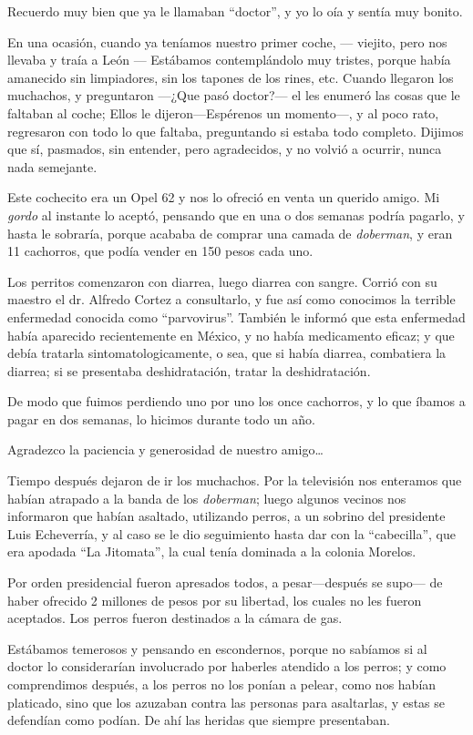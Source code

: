 \documentclass[letterpaper, 12pt]{book}
\begin{document}
Recuerdo muy bien que ya le llamaban ``doctor'', y yo lo oía y sentía muy bonito.

En una ocasión, cuando ya teníamos nuestro primer coche, --- viejito, pero nos llevaba y traía a León --- Estábamos contemplándolo muy tristes, porque había amanecido sin limpiadores, sin los tapones de los rines, etc. Cuando llegaron los muchachos, y preguntaron ---¿Que pasó doctor?--- el les enumeró las cosas que le faltaban al coche; Ellos le dijeron---Espérenos un momento---, y al poco rato, regresaron con todo lo que faltaba, preguntando si estaba todo completo. Dijimos que sí, pasmados, sin entender, pero agradecidos, y no volvió a ocurrir, nunca nada semejante.

Este cochecito era un Opel 62 y nos lo ofreció en venta un querido amigo. Mi \textit{gordo} al instante lo aceptó, pensando que en una o dos semanas podría pagarlo, y hasta le sobraría, porque acababa de comprar una camada de \textit{doberman}, y eran 11 cachorros, que podía vender en 150 pesos cada uno. 

Los perritos comenzaron con diarrea, luego diarrea con sangre. Corrió con su maestro el dr. Alfredo Cortez a consultarlo, y fue así como conocimos la terrible enfermedad conocida como ``parvovirus''. También le informó que esta enfermedad había aparecido recientemente en México, y no había medicamento eficaz; y que debía tratarla sintomatologicamente, o sea, que si había diarrea, combatiera la diarrea; si se presentaba deshidratación, tratar la deshidratación.

De modo que fuimos perdiendo uno por uno los once cachorros, y lo que íbamos a pagar en dos semanas, lo hicimos durante todo un año.

Agradezco la paciencia y generosidad de nuestro amigo\ldots

Tiempo después dejaron de ir los muchachos. Por la televisión nos enteramos que habían atrapado a la banda de los \textit{doberman}; luego algunos vecinos nos informaron que habían asaltado, utilizando perros, a un sobrino del presidente Luis Echeverría, y al caso se le dio seguimiento hasta dar con la ``cabecilla'', que era apodada ``La Jitomata'', la cual tenía dominada a la colonia Morelos. 

Por orden presidencial fueron apresados todos, a pesar---después se supo--- de haber ofrecido 2 millones de pesos por su libertad, los cuales no les fueron aceptados. Los perros fueron destinados a la cámara de gas.

Estábamos temerosos y pensando en escondernos, porque no sabíamos si al doctor lo considerarían involucrado por haberles atendido a los perros; y como comprendimos después, a los perros no los ponían a pelear, como nos habían platicado, sino que los azuzaban contra las personas para asaltarlas, y estas se defendían como podían. De ahí las heridas que siempre presentaban.
\end{document}
